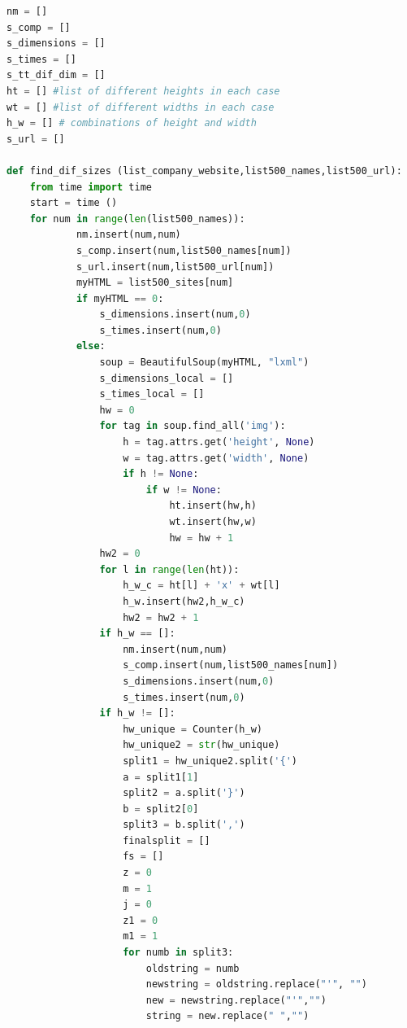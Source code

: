 \documentclass{book}
\begin{document}
\begin{lstlisting}[language=Python]
nm = []
s_comp = []
s_dimensions = []
s_times = []
s_tt_dif_dim = []
ht = [] #list of different heights in each case
wt = [] #list of different widths in each case
h_w = [] # combinations of height and width
s_url = []

def find_dif_sizes (list_company_website,list500_names,list500_url):
    from time import time 
    start = time ()
    for num in range(len(list500_names)):
            nm.insert(num,num)                  
            s_comp.insert(num,list500_names[num])
            s_url.insert(num,list500_url[num])
            myHTML = list500_sites[num] 
            if myHTML == 0:
                s_dimensions.insert(num,0)
                s_times.insert(num,0)    
            else: 
                soup = BeautifulSoup(myHTML, "lxml") 
                s_dimensions_local = []
                s_times_local = []
                hw = 0  
                for tag in soup.find_all('img'):
                    h = tag.attrs.get('height', None)
                    w = tag.attrs.get('width', None)
                    if h != None:
                        if w != None:
                            ht.insert(hw,h)
                            wt.insert(hw,w)
                            hw = hw + 1                        
                hw2 = 0
                for l in range(len(ht)):
                    h_w_c = ht[l] + 'x' + wt[l]
                    h_w.insert(hw2,h_w_c)                     
                    hw2 = hw2 + 1    
                if h_w == []:
                    nm.insert(num,num)                  
                    s_comp.insert(num,list500_names[num])
                    s_dimensions.insert(num,0)
                    s_times.insert(num,0)    
                if h_w != []:
                    hw_unique = Counter(h_w)
                    hw_unique2 = str(hw_unique)                    
                    split1 = hw_unique2.split('{')
                    a = split1[1]
                    split2 = a.split('}')
                    b = split2[0]
                    split3 = b.split(',')
                    finalsplit = []
                    fs = []
                    z = 0
                    m = 1
                    j = 0
                    z1 = 0
                    m1 = 1                    
                    for numb in split3:                
                        oldstring = numb
                        newstring = oldstring.replace("'", "")
                        new = newstring.replace("'","")
                        string = new.replace(" ","")

\end{lstlisting}
\end{document}
